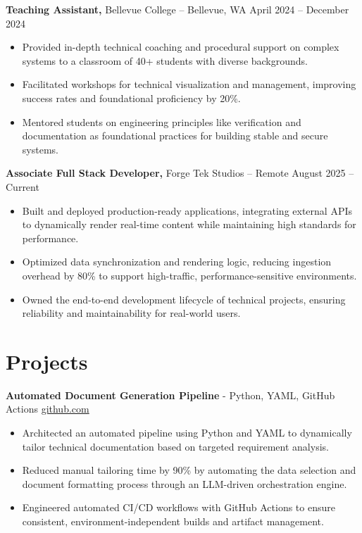 \documentclass[11pt]{article}       %
\begin{document}
\textbf{Teaching Assistant,} {Bellevue College} -- Bellevue, WA \hfill April 2024 -- December 2024 \\
\vspace{-9pt}
\begin{itemize}
  \item Provided in-depth technical coaching and procedural support on complex systems to a classroom of 40+ students with diverse backgrounds.
  \item Facilitated workshops for technical visualization and management, improving success rates and foundational proficiency by 20\%.
  \item Mentored students on engineering principles like verification and documentation as foundational practices for building stable and secure systems.
\end{itemize}

\textbf{Associate Full Stack Developer,} {Forge Tek Studios} -- Remote \hfill August 2025 -- Current 
\vspace{-9pt}
\begin{itemize}
  \item Built and deployed production-ready applications, integrating external APIs to dynamically render real-time content while maintaining high standards for performance.
  \item Optimized data synchronization and rendering logic, reducing ingestion overhead by 80\% to support high-traffic, performance-sensitive environments.
  \item Owned the end-to-end development lifecycle of technical projects, ensuring reliability and maintainability for real-world users.
\end{itemize}

\vspace{-18.5pt}

\section*{Projects}

\textbf{Automated Document Generation Pipeline}{ - Python, YAML, GitHub Actions} \hfill \href{https://github.com/Monica20030707/Tex_OrangeLeaf-mcp}{github.com} \\
\vspace{-9pt}
\begin{itemize}
  \item Architected an automated pipeline using Python and YAML to dynamically tailor technical documentation based on targeted requirement analysis.
  \item Reduced manual tailoring time by 90\% by automating the data selection and document formatting process through an LLM-driven orchestration engine.
  \item Engineered automated CI/CD workflows with GitHub Actions to ensure consistent, environment-independent builds and artifact management.
\end{itemize}
\end{document}
